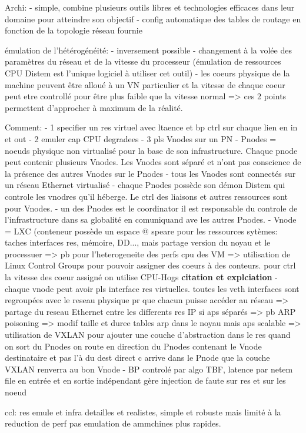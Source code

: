 Archi:
- simple, combine plusieurs outils libres et technologies efficaces dans leur domaine pour atteindre son objectif
- config automatique des tables de routage en fonction de la topologie réseau fournie

émulation de l'hétérogénéité:
- inversement possible
- changement à la volée des paramètres du réseau et de la vitesse du processeur (émulation de ressources CPU Distem est l'unique logiciel à utiliser cet outil)
- les coeurs physique de la machine peuvent  être alloué à un VN particulier et la vitesse de chaque coeur peut etre controllé pour être plus faible que la vitesse normal
=> ces 2 points permettent d'approcher à maximum de la réalité.

Comment:
- 1 specifier un res virtuel avec ltaence et bp ctrl sur chaque lien en in et out
- 2 emuler cap CPU degradees
- 3 pls Vnodes sur un PN
- Pnodes = noeuds physique non virtualisé pour la base de son infrastructure. Chaque pnode peut contenir plusieurs Vnodes. Les Vnodes sont séparé et n'ont pas conscience de la présence des autres Vnodes sur le Pnodes
- tous les Vnodes sont connectés sur un réseau Ethernet virtualisé
- chaque Pnodes possède son démon Distem qui controle les vnodres qu'il héberge. Le ctrl des liaisons et autres ressources sont pour Vnodes.
- un des Pnodes est le coordinator il est responsable du controle de l'infrastructure dans sa globalité en comuniquand ave les autres Pnodes.
- Vnode = LXC (conteneur possède un espace @ speare pour les ressources sytèmes: taches interfaces res, mémoire, DD..., mais partage version du noyau et le processuer => pb pour l'heterogeneite des perfs cpu des VM => utilisation de Linux Control Groups pour pouvoir assigner des coeurs à des conteurs. pour ctrl la vitesse des coeur assigné on utilise CPU-Hogs \textbf{citation et explciation}
- chaque vnode peut avoir pls interface res virtuelles. toutes les veth interfaces sont regroupées avec le reseau physique pr que chacun puisse accéder au réseau => partage du reseau Ethernet entre les differents res IP si aps séparés => pb ARP poisoning => modif taille et duree tables arp dans le noyau mais aps scalable => utilisation de VXLAN pour ajouter une couche d'abstraction dans le res quand on sort du Pnodes on route en direction du Pnodes contenant le Vnode destinataire et pas l'à du dest direct c arrive dans le Pnode que la couche VXLAN renverra au bon Vnode
- BP controlé par algo TBF, latence par netem file en entrée et en sortie indépendant
gère injection de faute sur res et sur les noeud

ccl:
res emule et infra detailles et realistes, simple et robuste mais limité à la reduction de perf pas emulation de ammchines plus rapides.


